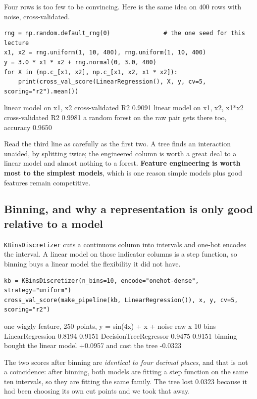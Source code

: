\documentclass[11pt]{article}
\begin{document}
Four rows is too few to be convincing. Here is the same idea on $400$ rows with
noise, cross-validated.

\begin{lstlisting}
rng = np.random.default_rng(0)               # the one seed for this lecture
x1, x2 = rng.uniform(1, 10, 400), rng.uniform(1, 10, 400)
y = 3.0 * x1 * x2 + rng.normal(0, 3.0, 400)
for X in (np.c_[x1, x2], np.c_[x1, x2, x1 * x2]):
    print(cross_val_score(LinearRegression(), X, y, cv=5, scoring="r2").mean())
\end{lstlisting}
\begin{codeout}
linear model on x1, x2          cross-validated R2 0.9091
linear model on x1, x2, x1*x2   cross-validated R2 0.9981
a random forest on the raw pair gets there too, accuracy 0.9650
\end{codeout}

Read the third line as carefully as the first two. A tree finds an interaction
unaided, by splitting twice; the engineered column is worth a great deal to a
linear model and almost nothing to a forest. \textbf{Feature engineering is
worth most to the simplest models}, which is one reason simple models plus
good features remain competitive.

\subsection{Binning, and why a representation is only good relative to a model}
\label{sec:binning}

\texttt{KBinsDiscretizer} cuts a continuous column into intervals and one-hot
encodes the interval. A linear model on those indicator columns is a step
function, so binning buys a linear model the flexibility it did not have.

\begin{lstlisting}
kb = KBinsDiscretizer(n_bins=10, encode="onehot-dense", strategy="uniform")
cross_val_score(make_pipeline(kb, LinearRegression()), x, y, cv=5, scoring="r2")
\end{lstlisting}
\begin{codeout}
one wiggly feature, 250 points, y = sin(4x) + x + noise
                            raw x    10 bins
LinearRegression           0.8194     0.9151
DecisionTreeRegressor      0.9475     0.9151
binning bought the linear model +0.0957 and cost the tree -0.0323
\end{codeout}

The two scores after binning are \emph{identical to four decimal places}, and
that is not a coincidence: after binning, both models are fitting a step
function on the same ten intervals, so they are fitting the same family. The
tree lost $0.0323$ because it had been choosing its own cut points and we took
that away.
\end{document}
